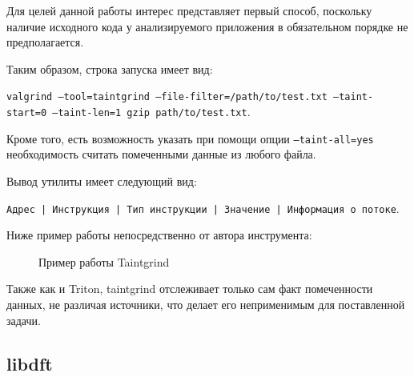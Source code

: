 Для целей данной работы интерес представляет первый способ, поскольку наличие исходного кода у анализируемого приложения в обязательном порядке не предполагается.

Таким образом, строка запуска имеет вид:
\bigskip

        \texttt{valgrind --tool=taintgrind --file-filter=/path/to/test.txt --taint-start=0 --taint-len=1 gzip path/to/test.txt}.

\bigskip
Кроме того, есть возможность указать при помощи опции \texttt{--taint-all=yes} необходимость считать помеченными данные из любого файла.

Вывод утилиты имеет следующий вид:

\mbox{\texttt{Адрес | Инструкция | Тип инструкции | Значение | Информация о потоке}}.

Ниже пример работы непосредственно от автора инструмента:

\begin{figure}[H]
    \caption{Пример работы Taintgrind}
    \label{fig:taintgrind}
\end{figure}

Также как и Triton, taintgrind отслеживает только сам факт помеченности данных, не различая источники, что делает его неприменимым для поставленной задачи.

\subsection{libdft}

